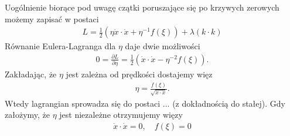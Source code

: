 Uogólnienie biorące pod uwagę czątki poruszające się
po krzywych zerowych możemy zapisać w 
postaci~\cite{polchinski_1998}
\begin{align}
L =  \frac{1}{2} \left(  
\eta \dot{x} \cdot \dot{x} +  \eta^{-1} f( \xi ) \right)  
+ \lambda ( k\cdot k )
\end{align}
Równanie Eulera-Lagranga dla $\eta$ daje dwie możliwości
\begin{align}
0 = \frac{\partial L }{\partial \eta} =  \frac{1}{2}
\left( \dot{x} \cdot \dot{x} -
\eta^{-2} f(\xi)  \right).
\end{align}
Zakładając, że $\eta$ jest zależna od prędkości 
dostajemy więz
\begin{align*}
\eta = \frac{f(\xi)}{\sqrt{\dot{x} \cdot \dot{x}}}.
\end{align*}
Wtedy lagrangian sprowadza się do postaci ... 
(z dokładnością do stałej).
Gdy założymy, że $\eta$ jest niezależne otrzymujemy
więzy 
\begin{align}
\dot{x} \cdot \dot{x} = 0, \quad f(\xi) = 0
\end{align}

